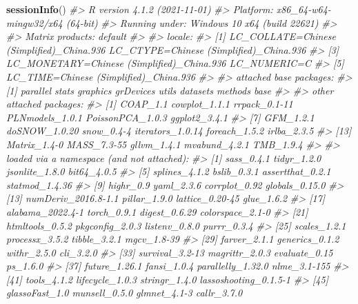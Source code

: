 \documentclass[
]{article}
\newenvironment{Shaded}{\begin{snugshade}}{\end{snugshade}}
\newcommand{\CommentTok}[1]{\textcolor[rgb]{0.56,0.35,0.01}{\textit{#1}}}
\newcommand{\KeywordTok}[1]{\textcolor[rgb]{0.13,0.29,0.53}{\textbf{#1}}}
\newcommand{\NormalTok}[1]{#1}
\begin{document}
\begin{Shaded}
\begin{Highlighting}[]
\KeywordTok{sessionInfo}\NormalTok{()}
\CommentTok{#> R version 4.1.2 (2021-11-01)}
\CommentTok{#> Platform: x86_64-w64-mingw32/x64 (64-bit)}
\CommentTok{#> Running under: Windows 10 x64 (build 22621)}
\CommentTok{#> }
\CommentTok{#> Matrix products: default}
\CommentTok{#> }
\CommentTok{#> locale:}
\CommentTok{#> [1] LC_COLLATE=Chinese (Simplified)_China.936  LC_CTYPE=Chinese (Simplified)_China.936   }
\CommentTok{#> [3] LC_MONETARY=Chinese (Simplified)_China.936 LC_NUMERIC=C                              }
\CommentTok{#> [5] LC_TIME=Chinese (Simplified)_China.936    }
\CommentTok{#> }
\CommentTok{#> attached base packages:}
\CommentTok{#> [1] parallel  stats     graphics  grDevices utils     datasets  methods   base     }
\CommentTok{#> }
\CommentTok{#> other attached packages:}
\CommentTok{#>  [1] COAP_1.1         cowplot_1.1.1    rrpack_0.1-11    PLNmodels_1.0.1  PoissonPCA_1.0.3 ggplot2_3.4.1   }
\CommentTok{#>  [7] GFM_1.2.1        doSNOW_1.0.20    snow_0.4-4       iterators_1.0.14 foreach_1.5.2    irlba_2.3.5     }
\CommentTok{#> [13] Matrix_1.4-0     MASS_7.3-55      gllvm_1.4.1      mvabund_4.2.1    TMB_1.9.4       }
\CommentTok{#> }
\CommentTok{#> loaded via a namespace (and not attached):}
\CommentTok{#>  [1] sass_0.4.1            tidyr_1.2.0           jsonlite_1.8.0        bit64_4.0.5          }
\CommentTok{#>  [5] splines_4.1.2         bslib_0.3.1           assertthat_0.2.1      statmod_1.4.36       }
\CommentTok{#>  [9] highr_0.9             yaml_2.3.6            corrplot_0.92         globals_0.15.0       }
\CommentTok{#> [13] numDeriv_2016.8-1.1   pillar_1.9.0          lattice_0.20-45       glue_1.6.2           }
\CommentTok{#> [17] alabama_2022.4-1      torch_0.9.1           digest_0.6.29         colorspace_2.1-0     }
\CommentTok{#> [21] htmltools_0.5.2       pkgconfig_2.0.3       listenv_0.8.0         purrr_0.3.4          }
\CommentTok{#> [25] scales_1.2.1          processx_3.5.2        tibble_3.2.1          mgcv_1.8-39          }
\CommentTok{#> [29] farver_2.1.1          generics_0.1.2        withr_2.5.0           cli_3.2.0            }
\CommentTok{#> [33] survival_3.2-13       magrittr_2.0.3        evaluate_0.15         ps_1.6.0             }
\CommentTok{#> [37] future_1.26.1         fansi_1.0.4           parallelly_1.32.0     nlme_3.1-155         }
\CommentTok{#> [41] tools_4.1.2           lifecycle_1.0.3       stringr_1.4.0         lassoshooting_0.1.5-1}
\CommentTok{#> [45] glassoFast_1.0        munsell_0.5.0         glmnet_4.1-3          callr_3.7.0          }

\end{Highlighting}
\end{Shaded}
\end{document}
